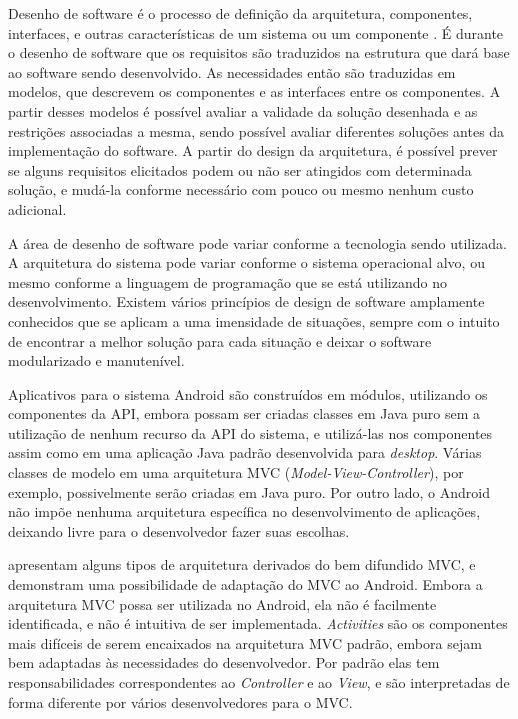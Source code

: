 Desenho de software é o processo de definição da arquitetura, componentes, interfaces, e outras características de um sistema ou um componente \cite{swebok}. É durante o desenho de software que os requisitos são traduzidos na estrutura que dará base ao software sendo desenvolvido. As necessidades então são traduzidas em modelos, que descrevem os componentes e as interfaces entre os componentes. A partir desses modelos é possível avaliar a validade da solução desenhada e as restrições associadas a mesma, sendo possível avaliar diferentes soluções antes da implementação do software. A partir do design da arquitetura, é possível prever se alguns requisitos elicitados podem ou não ser atingidos com determinada solução, e mudá-la conforme necessário com pouco ou mesmo nenhum custo adicional.

A área de desenho de software pode variar conforme a tecnologia sendo utilizada. A arquitetura do sistema pode variar conforme o sistema operacional alvo, ou mesmo conforme a linguagem de programação que se está utilizando no desenvolvimento. Existem vários princípios de design de software amplamente conhecidos que se aplicam a uma imensidade de situações, sempre com o intuito de encontrar a melhor solução para cada situação e deixar o software modularizado e manutenível.

Aplicativos para o sistema Android são construídos em módulos, utilizando os componentes da API, embora possam ser criadas classes em Java puro sem a utilização de nenhum recurso da API do sistema, e utilizá-las nos componentes assim como em uma aplicação Java padrão desenvolvida para \textit{desktop}. Várias classes de modelo em uma arquitetura MVC (\textit{Model-View-Controller}), por exemplo, possivelmente serão criadas em Java puro. Por outro lado, o Android não impõe nenhuma arquitetura específica no desenvolvimento de aplicações, deixando livre para o desenvolvedor fazer suas escolhas.

 apresentam alguns tipos de arquitetura derivados do bem difundido MVC, e demonstram uma possibilidade de adaptação do MVC ao Android. Embora a arquitetura MVC possa ser utilizada no Android, ela não é facilmente identificada, e não é intuitiva de ser implementada. \textit{Activities} são os componentes mais difíceis de serem encaixados na arquitetura MVC padrão, embora sejam bem adaptadas às necessidades do desenvolvedor. Por padrão elas tem responsabilidades correspondentes ao \textit{Controller} e ao \textit{View}, e são interpretadas de forma diferente por vários desenvolvedores para o MVC.

